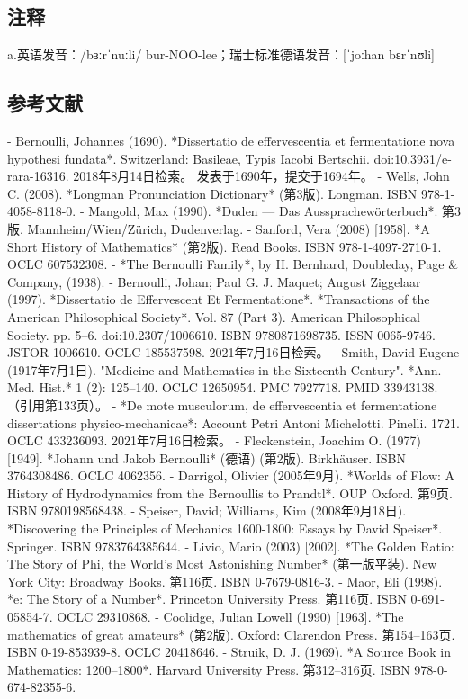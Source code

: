 \subsection{注释}  
a.英语发音：/bɜːrˈnuːli/ bur-NOO-lee；瑞士标准德语发音：[ˈjoːhan bɛrˈnʊli]
\subsection{参考文献}  
- Bernoulli, Johannes (1690). *Dissertatio de effervescentia et fermentatione nova hypothesi fundata*. Switzerland: Basileae, Typis Iacobi Bertschii. doi:10.3931/e-rara-16316. 2018年8月14日检索。  
  发表于1690年，提交于1694年。  
- Wells, John C. (2008). *Longman Pronunciation Dictionary* (第3版). Longman. ISBN 978-1-4058-8118-0.  
- Mangold, Max (1990). *Duden — Das Aussprachewörterbuch*. 第3版. Mannheim/Wien/Zürich, Dudenverlag.  
- Sanford, Vera (2008) [1958]. *A Short History of Mathematics* (第2版). Read Books. ISBN 978-1-4097-2710-1. OCLC 607532308.  
- *The Bernoulli Family*, by H. Bernhard, Doubleday, Page & Company, (1938).  
- Bernoulli, Johan; Paul G. J. Maquet; August Ziggelaar (1997). *Dissertatio de Effervescent Et Fermentatione*. *Transactions of the American Philosophical Society*. Vol. 87 (Part 3). American Philosophical Society. pp. 5–6. doi:10.2307/1006610. ISBN 9780871698735. ISSN 0065-9746. JSTOR 1006610. OCLC 185537598. 2021年7月16日检索。  
- Smith, David Eugene (1917年7月1日). "Medicine and Mathematics in the Sixteenth Century". *Ann. Med. Hist.* 1 (2): 125–140. OCLC 12650954. PMC 7927718. PMID 33943138. （引用第133页）。  
- *De mote musculorum, de effervescentia et fermentatione dissertations physico-mechanicae*: Account Petri Antoni Michelotti. Pinelli. 1721. OCLC 433236093. 2021年7月16日检索。  
- Fleckenstein, Joachim O. (1977) [1949]. *Johann und Jakob Bernoulli* (德语) (第2版). Birkhäuser. ISBN 3764308486. OCLC 4062356.  
- Darrigol, Olivier (2005年9月). *Worlds of Flow: A History of Hydrodynamics from the Bernoullis to Prandtl*. OUP Oxford. 第9页. ISBN 9780198568438.  
- Speiser, David; Williams, Kim (2008年9月18日). *Discovering the Principles of Mechanics 1600-1800: Essays by David Speiser*. Springer. ISBN 9783764385644.  
- Livio, Mario (2003) [2002]. *The Golden Ratio: The Story of Phi, the World's Most Astonishing Number* (第一版平装). New York City: Broadway Books. 第116页. ISBN 0-7679-0816-3.  
- Maor, Eli (1998). *e: The Story of a Number*. Princeton University Press. 第116页. ISBN 0-691-05854-7. OCLC 29310868.  
- Coolidge, Julian Lowell (1990) [1963]. *The mathematics of great amateurs* (第2版). Oxford: Clarendon Press. 第154–163页. ISBN 0-19-853939-8. OCLC 20418646.  
- Struik, D. J. (1969). *A Source Book in Mathematics: 1200–1800*. Harvard University Press. 第312–316页. ISBN 978-0-674-82355-6.